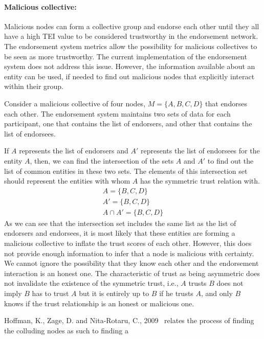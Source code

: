 \paragraph{Malicious collective:}Malicious nodes can form a collective group
and endorse each other until they all have a high \ac{TEI} value to be
considered trustworthy in the endorsement network. The endorsement system
metrics allow the possibility for malicious collectives to be seen as more
trustworthy. The current implementation of the endorsement system does not
address this issue. However, the information available about an entity can be
used, if needed to find out malicious nodes that explicitly interact within
their group. \par
Consider a malicious collective of four nodes, $M = \{A,B,C,D\}$ that endorses
each other. The endorsement system maintains two sets of data for each
participant, one that contains the list of endorsers, and other that contains
the list of endorsees. \par
If $A$ represents the list of endorsers and $A'$ represents the list of
endorsees for the entity $A$, then, we can find the intersection of the sets
$A$ and $A'$ to find out the list of common entities in these two sets. The
elements of this intersection set should represent the entities with whom $A$
has the symmetric trust relation with.  
\begin{equation}
	\begin{split}
	A= \{B,C,D\} \\
	A' = \{B,C,D\} \\
	A \cap A' = \{B,C,D\}
\end{split}
\end{equation}
As we can see that the intersection set includes the same list as the list of
endorsers and endorsees, it is most likely that these entities are forming a
malicious collective to inflate the trust scores of each other. However, this
does not provide enough information to infer that a node is malicious with
certainty. We cannot ignore the possibility that they know each other and the
endorsement interaction is an honest one. The characteristic of trust as being
asymmetric does not invalidate the existence of the symmetric trust, i.e., $A$
trusts $B$ does not imply $B$ has to trust $A$ but it is entirely up to $B$ if
he trusts $A$, and only $B$ knows if the trust relationship is an honest or
malicious one. \par
Hoffman, K., Zage, D. and Nita-Rotaru, C., 2009~\cite{hoffman2009survey}
relates the process of finding the colluding nodes as such to finding a
